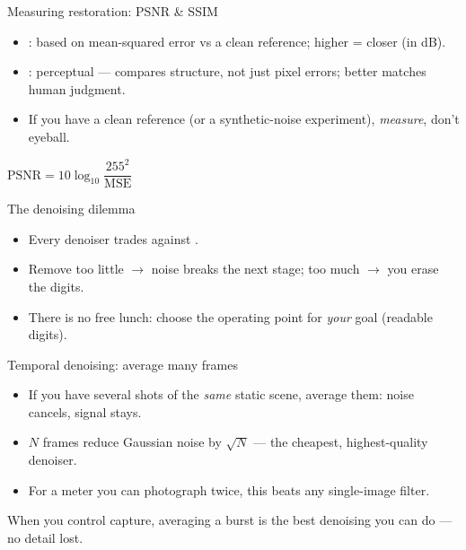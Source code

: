 \documentclass[10pt,aspectratio=169]{beamer}
\begin{document}
\begin{frame}{Measuring restoration: PSNR \& SSIM}
  \begin{itemize}
    \item {}: based on mean-squared error vs a clean reference; higher = closer (in dB).
    \item {}: perceptual — compares structure, not just pixel errors; better matches human judgment.
    \item If you have a clean reference (or a synthetic-noise experiment), \emph{measure}, don't eyeball.
  \end{itemize}
  \begin{mathbox}
    $\mathrm{PSNR}=10\log_{10}\dfrac{255^2}{\mathrm{MSE}}$
  \end{mathbox}
\end{frame}

\begin{frame}{The denoising dilemma}
  \begin{itemize}
    \item Every denoiser trades  against .
    \item Remove too little $\rightarrow$ noise breaks the next stage; too much $\rightarrow$ you erase the digits.
    \item There is no free lunch: choose the operating point for \emph{your} goal (readable digits).
  \end{itemize}
\end{frame}

\begin{frame}{Temporal denoising: average many frames}
  \begin{itemize}
    \item If you have several shots of the \emph{same} static scene, average them: noise cancels, signal stays.
    \item $N$ frames reduce Gaussian noise by $\sqrt{N}$ — the cheapest, highest-quality denoiser.
    \item For a meter you can photograph twice, this beats any single-image filter.
  \end{itemize}
  \begin{goodbox}
    When you control capture, averaging a burst is the best denoising you can do — no detail lost.
  \end{goodbox}
\end{frame}
\end{document}
